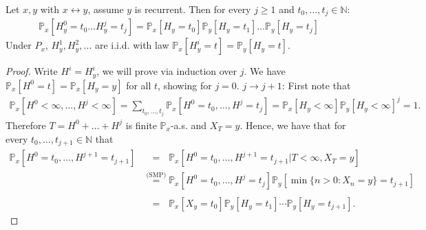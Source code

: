 \begin{lemma}[]
	Let $x,y$ with $x \leftrightarrow y$, assume $y$ is recurrent. Then for every $j \geq 1$ and $t_0, \ldots, t_j \in \mathbb{N}$:
\begin{align}
	\mathbb{P}_{x} \left[ H_y^0=t_0 \ldots H_y^j=t_j \right] = \mathbb{P}_{x} \left[ H_y=t_0 \right] \mathbb{P}_{y} \left[ H_y=t_1 \right]  \ldots  \mathbb{P}_{y} \left[ H_y=t_j \right] 
\end{align}
Under $P_x$, $H_y^1,H_y^2, \ldots $ are i.i.d. with law $\mathbb{P}_{x} \left[ H_y^i=t \right] = \mathbb{P}_{y} \left[ H_y=t \right] $.
\end{lemma}
\begin{proof}
	Write $H^i = H_y^i$, we will prove via induction over $j$. We have $\mathbb{P}_{x} \left[ H^0 = t \right]  = \mathbb{P}_{x} \left[ H_y = y \right] $ for all $t$, showing for $j=0$.
	$j \to j+1$: First note that 
	\begin{align}
	\mathbb{P}_{x} \left[ H^0 < \infty, \ldots, H^j < \infty \right] = \sum_{t_0,\ldots, t_j}^{} \mathbb{P}_{x} \left[ H^0 = t_0, \ldots, H^j=t_j \right] = \mathbb{P}_{x} \left[ H_y < \infty \right] \mathbb{P}_{y} \left[ H_y < \infty \right] ^j = 1.
	\end{align}
	Therefore $T = H^0 + \ldots + H^j$ is finite $\mathbb{P}_{x} $-a.s. and $X_T=y$. Hence, we have that for every $t_0,\ldots,t_{j+1} \in \mathbb{N}$ that
	\begin{align}
		\mathbb{P}_{x} \left[ H^0=t_0,\ldots,H^{j+1}=t_{j+1} \right] &\stackrel{\phantom{\textrm{(SMP)}}}{=} \mathbb{P}_{x} \left[ H^0 = t_0, \ldots, H^{j+1}=t_{j+1} | T<\infty, X_T = y \right]  \\
		&\stackrel{\textrm{(SMP)}}{=} \mathbb{P}_{x} \left[ H^0=t_0, \ldots, H^j=t_j \right] \mathbb{P}_{y} \left[ \min\{n> 0: X_n =y\} = t_{j+1} \right] \\ 
	&\stackrel{\phantom{\textrm{(SMP)}}}{=} \mathbb{P}_{x} \left[ X_y = t_0 \right] \mathbb{P}_{y} \left[ H_y = t_1 \right] \cdots \mathbb{P}_{y} \left[ H_y = t_{j+1} \right]  
	.\end{align}
\end{proof}

